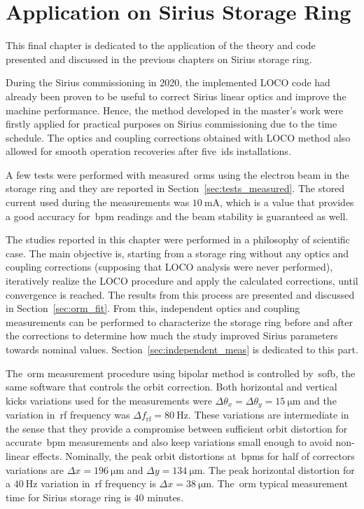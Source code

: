 \chapter{Application on Sirius Storage Ring}

This final chapter is dedicated to the application of the theory and code presented and discussed in the previous chapters on Sirius storage ring. 

During the Sirius commissioning in 2020, the implemented LOCO code had already been proven to be useful to correct Sirius linear optics and improve the machine performance. Hence, the method developed in the master's work were firstly applied for practical purposes on Sirius commissioning due to the time schedule. The optics and coupling corrections obtained with LOCO method also allowed for smooth operation recoveries after five~\glspl{id} installations.

A few tests were performed with measured~\glspl{orm} using the electron beam in the storage ring and they are reported in Section~\ref{sec:tests_measured}. The stored current used during the measurements was $\SI{10}{\milli\ampere}$, which is a value that provides a good accuracy for~\gls{bpm} readings and the beam stability is guaranteed as well.

The studies reported in this chapter were performed in a philosophy of scientific case. The main objective is, starting from a storage ring without any optics and coupling corrections (supposing that LOCO analysis were never performed), iteratively realize the LOCO procedure and apply the calculated corrections, until convergence is reached. The results from this process are presented and discussed in Section~\ref{sec:orm_fit}. From this, independent optics and coupling measurements can be performed to characterize the storage ring before and after the corrections to determine how much the study improved Sirius parameters towards nominal values. Section~\ref{sec:independent_meas} is dedicated to this part.

The~\gls{orm} measurement procedure using bipolar method is controlled by~\gls{sofb}, the same software that controls the orbit correction. Both horizontal and vertical kicks variations used for the measurements were $\Delta \theta_x = \Delta \theta_y = \SI{15}{\micro\meter}$ and the variation in~\gls{rf} frequency was $\Delta f_{\mathrm{rf}} = \SI{80}{\hertz}$. These variations are intermediate in the sense that they provide a compromise between sufficient orbit distortion for accurate~\gls{bpm} measurements and also keep variations small enough to avoid non-linear effects. Nominally, the peak orbit distortions at~\glspl{bpm} for half of correctors variations are $\Delta x = \SI{196}{\micro\meter}$ and $\Delta y = \SI{134}{\micro\meter}$. The peak horizontal distortion for a $\SI{40}{\hertz}$ variation in~\gls{rf} frequency is $\Delta x = \SI{38}{\micro\meter}$. The~\gls{orm} typical measurement time for Sirius storage ring is $40$ minutes.


